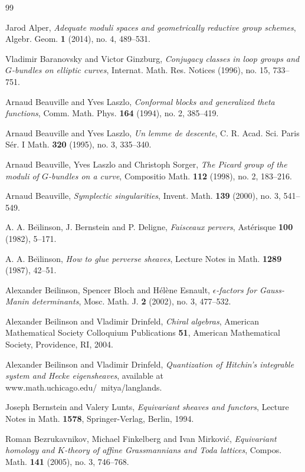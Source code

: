 \begin{thebibliography}{99}

 Jarod Alper, \emph{Adequate moduli spaces and geometrically reductive group schemes}, Algebr. Geom. \textbf{1} (2014), no. 4, 489--531.

 Vladimir Baranovsky and Victor Ginzburg, \emph{Conjugacy classes in loop groups and $G$-bundles on elliptic curves}, Internat. Math. Res. Notices (1996), no. 15, 733--751.

 Arnaud Beauville and Yves Laszlo, \emph{Conformal blocks and generalized theta functions}, Comm. Math. Phys. \textbf{164} (1994), no. 2, 385--419.

 Arnaud Beauville and Yves Laszlo, \emph{Un lemme de descente}, C. R. Acad. Sci. Paris S\'er. I Math. \textbf{320} (1995), no. 3, 335--340.

 Arnaud Beauville, Yves Laszlo and Christoph Sorger, \emph{The Picard group of the moduli of $G$-bundles on a curve}, Compositio Math. \textbf{112} (1998), no. 2, 183--216.

 Arnaud Beauville, \emph{Symplectic singularities}, Invent. Math. \textbf{139} (2000), no. 3, 541--549.

 A. A. Be{\u\i}linson, J. Bernstein and P. Deligne, \emph{Faisceaux pervers}, Ast\'erisque \textbf{100} (1982), 5--171.

 A. A. Be{\u\i}linson, \emph{How to glue perverse sheaves}, Lecture Notes in Math. \textbf{1289} (1987), 42--51.

 Alexander Beilinson, Spencer Bloch and H{\'e}l{\`e}ne Esnault, \emph{$\epsilon$-factors for Gauss-Manin determinants}, Mosc. Math. J. \textbf{2} (2002), no. 3, 477--532.

 Alexander Beilinson and Vladimir Drinfeld, \emph{Chiral algebras}, American Mathematical Society Colloquium Publications \textbf{51}, American Mathematical Society, Providence, RI, 2004.

 Alexander Beilinson and Vladimir Drinfeld, \emph{Quantization of Hitchin's integrable system and Hecke eigensheaves}, available at www.math.uchicago.edu/~mitya/langlands.

 Joseph Bernstein and Valery Lunts, \emph{Equivariant sheaves and functors}, Lecture Notes in Math. \textbf{1578}, Springer-Verlag, Berlin, 1994.

 Roman Bezrukavnikov, Michael Finkelberg and Ivan Mirkovi{\'c}, \emph{Equivariant homology and $K$-theory of affine Grassmannians and Toda lattices}, Compos. Math. \textbf{141} (2005), no. 3, 746--768.


\end{thebibliography}
